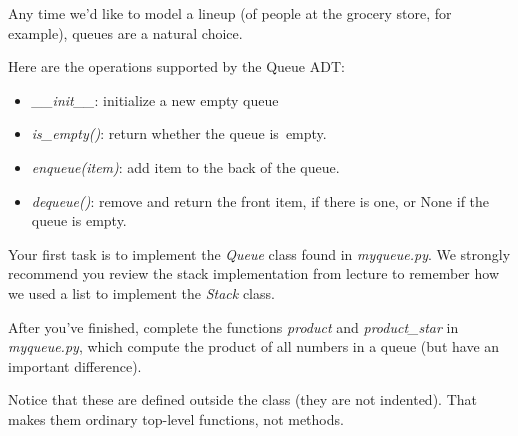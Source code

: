 \documentclass[12pt]{article}
\begin{document}
\bigskip

\noindent Any time we’d like to model a lineup (of people at the grocery store, for example),
queues are a natural choice.

\bigskip

\noindent Here are the operations supported by the Queue ADT:

\begin{itemize}
\item \textit{\_\_init\_\_}: initialize a new empty queue
\item \textit{is\_empty()}: return whether the queue is\ empty.
\item \textit{enqueue(item)}: add item to the back of the queue.
\item \textit{dequeue()}: remove and return the front item, if there is one, or None if the queue
is empty.
\end{itemize}

\noindent Your first task is to implement the \textit{Queue} class found in \textit{myqueue.py}.
We strongly recommend you review the stack implementation from lecture to remember
how we used a list to implement the \textit{Stack} class.

\bigskip

\noindent After you’ve finished, complete the functions \textit{product} and \textit{product\_star} in \textit{myqueue.py},
which compute the product of all numbers in a queue (but have an important difference).

\bigskip

\noindent Notice that these are defined outside the class (they are not indented). That makes
them ordinary top-level functions, not methods.

\bigskip
\end{document}
